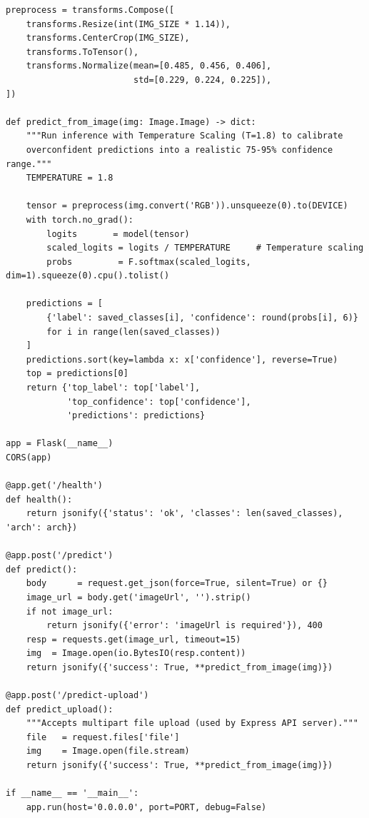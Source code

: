 \documentclass[12pt,a4paper]{report}
\begin{document}
\begin{lstlisting}[style=python, caption={Temperature-scaled prediction function and Flask endpoints (ml/serve.py)}]
preprocess = transforms.Compose([
    transforms.Resize(int(IMG_SIZE * 1.14)),
    transforms.CenterCrop(IMG_SIZE),
    transforms.ToTensor(),
    transforms.Normalize(mean=[0.485, 0.456, 0.406],
                         std=[0.229, 0.224, 0.225]),
])

def predict_from_image(img: Image.Image) -> dict:
    """Run inference with Temperature Scaling (T=1.8) to calibrate
    overconfident predictions into a realistic 75-95% confidence range."""
    TEMPERATURE = 1.8

    tensor = preprocess(img.convert('RGB')).unsqueeze(0).to(DEVICE)
    with torch.no_grad():
        logits       = model(tensor)
        scaled_logits = logits / TEMPERATURE     # Temperature scaling
        probs         = F.softmax(scaled_logits, dim=1).squeeze(0).cpu().tolist()

    predictions = [
        {'label': saved_classes[i], 'confidence': round(probs[i], 6)}
        for i in range(len(saved_classes))
    ]
    predictions.sort(key=lambda x: x['confidence'], reverse=True)
    top = predictions[0]
    return {'top_label': top['label'],
            'top_confidence': top['confidence'],
            'predictions': predictions}

app = Flask(__name__)
CORS(app)

@app.get('/health')
def health():
    return jsonify({'status': 'ok', 'classes': len(saved_classes), 'arch': arch})

@app.post('/predict')
def predict():
    body      = request.get_json(force=True, silent=True) or {}
    image_url = body.get('imageUrl', '').strip()
    if not image_url:
        return jsonify({'error': 'imageUrl is required'}), 400
    resp = requests.get(image_url, timeout=15)
    img  = Image.open(io.BytesIO(resp.content))
    return jsonify({'success': True, **predict_from_image(img)})

@app.post('/predict-upload')
def predict_upload():
    """Accepts multipart file upload (used by Express API server)."""
    file   = request.files['file']
    img    = Image.open(file.stream)
    return jsonify({'success': True, **predict_from_image(img)})

if __name__ == '__main__':
    app.run(host='0.0.0.0', port=PORT, debug=False)
\end{lstlisting}

\newpage
\end{document}

